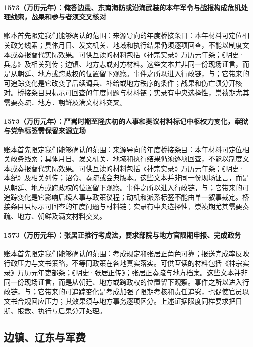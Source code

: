 \paragraph{1573（万历元年）：俺答边患、东南海防或沿海武装的本年军令与战报构成危机处理线索，战果和参与者须交叉核对} 账本首先限定我们能够确认的范围：来源导向的年度桥接条目：本年材料可定位相关政务线索；具体月日、发文机关、地域和执行结果仍须逐项回查，不能以制度文本或奏报替代实际效果。可供互读的材料包括《神宗实录》万历元年条；《明史·兵志》及相关列传；边镇、地方志或对方材料。这些文本并非同一份现场证言，而是从朝廷、地方或跨政权的位置留下观察。事件之所以进入行政链，与；它带来的可追踪变化是它改变了后续调兵、补给或地方秩序的条件；战果和伤亡须分开核对。桥接条目只标示可回查的年度问题与材料链；实录有中央选择性，崇祯期尤其需要奏疏、地方、朝鲜及满文材料交叉。

\paragraph{1573（万历元年）：严嵩时期至隆庆初的人事和奏议材料标记中枢权力变化，案狱与党争标签需保留来源立场} 账本首先限定我们能够确认的范围：来源导向的年度桥接条目：本年材料可定位相关政务线索；具体月日、发文机关、地域和执行结果仍须逐项回查，不能以制度文本或奏报替代实际效果。可供互读的材料包括《神宗实录》万历元年条；《明史·本纪》及相关列传；诏令、奏疏或会典版本。这些文本并非同一份现场证言，而是从朝廷、地方或跨政权的位置留下观察。事件之所以进入行政链，与；它带来的可追踪变化是它影响后续人事与政策议程；动机和派系标签不能由单一叙事裁定。桥接条目只标示可回查的年度问题与材料链；实录有中央选择性，崇祯期尤其需要奏疏、地方、朝鲜及满文材料交叉。

\paragraph{1573（万历元年）：张居正推行考成法，要求部院与地方官限期申报、完成政务} 账本首先限定我们能够确认的范围：考成规定和张居正角色可靠；报送完成率反映行政压力与文书策略，不等同政策在各地真实落实。可供互读的材料包括《神宗实录》万历元年吏部条；《明史·张居正传》；张居正奏疏与地方档案。这些文本并非同一份现场证言，而是从朝廷、地方或跨政权的位置留下观察。事件之所以进入行政链，与；它带来的可追踪变化是考成加强了限期考核和责任追究，也促使官员以文书合规回应压力；其效果须与地方事务逐项区分。上述证据限度同样要求把日期、报数、执行与后果分开处理。

\subsection{边镇、辽东与军费}

